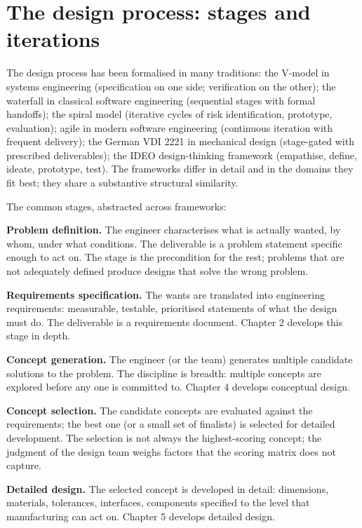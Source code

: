 \section{The design process: stages and iterations}

The design process has been formalised in many traditions: the V-model in systems engineering (specification on one side; verification on the other); the waterfall in classical software engineering (sequential stages with formal handoffs); the spiral model (iterative cycles of risk identification, prototype, evaluation); agile in modern software engineering (continuous iteration with frequent delivery); the German VDI 2221 in mechanical design (stage-gated with prescribed deliverables); the IDEO design-thinking framework (empathise, define, ideate, prototype, test). The frameworks differ in detail and in the domains they fit best; they share a substantive structural similarity.

The common stages, abstracted across frameworks:

\textbf{Problem definition.} The engineer characterises what is actually wanted, by whom, under what conditions. The deliverable is a problem statement specific enough to act on. The stage is the precondition for the rest; problems that are not adequately defined produce designs that solve the wrong problem.

\textbf{Requirements specification.} The wants are translated into engineering requirements: measurable, testable, prioritised statements of what the design must do. The deliverable is a requirements document. Chapter 2 develops this stage in depth.

\textbf{Concept generation.} The engineer (or the team) generates multiple candidate solutions to the problem. The discipline is breadth: multiple concepts are explored before any one is committed to. Chapter 4 develops conceptual design.

\textbf{Concept selection.} The candidate concepts are evaluated against the requirements; the best one (or a small set of finalists) is selected for detailed development. The selection is not always the highest-scoring concept; the judgment of the design team weighs factors that the scoring matrix does not capture.

\textbf{Detailed design.} The selected concept is developed in detail: dimensions, materials, tolerances, interfaces, components specified to the level that manufacturing can act on. Chapter 5 develops detailed design.

